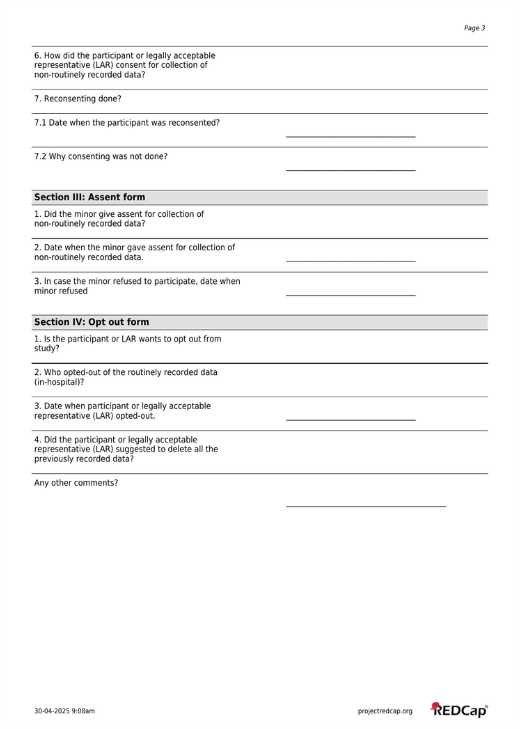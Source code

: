 \documentclass[
]{scrartcl}
\begin{document}
\includegraphics{../case-record-form/instrument-pdfs/pages/all-instruments-3.pdf}
\end{document}
